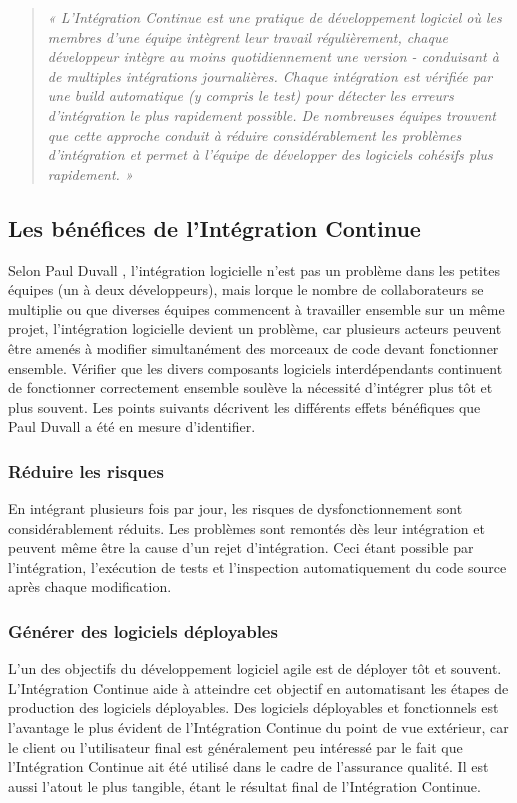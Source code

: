   \begin{quotation}
    \emph{« L'Intégration Continue est une pratique de développement logiciel où les membres d'une équipe intègrent leur travail régulièrement, chaque développeur intègre au moins quotidiennement une version - conduisant à de multiples intégrations journalières. Chaque intégration est vérifiée par une build automatique (y compris le test) pour détecter les erreurs d'intégration le plus rapidement possible. De nombreuses équipes trouvent que cette approche conduit à réduire considérablement les problèmes d'intégration et permet à l'équipe de développer des logiciels cohésifs plus rapidement. »}\\
  \end{quotation}

    \subsection{Les bénéfices de l’Intégration Continue}\label{Benefits}
    Selon Paul Duvall \cite{Duv07}, l'intégration logicielle n’est pas un problème dans les petites équipes (un à deux développeurs), mais lorque le nombre de collaborateurs se multiplie ou que diverses équipes commencent à travailler ensemble sur un même projet, l'intégration logicielle devient un problème, car plusieurs acteurs peuvent être amenés à modifier simultanément des morceaux de code devant fonctionner ensemble. Vérifier que les divers composants logiciels interdépendants continuent de fonctionner correctement ensemble soulève la nécessité d'intégrer plus tôt et plus souvent. Les points suivants décrivent les différents effets bénéfiques que Paul Duvall a été en mesure d'identifier.

      \subsubsection{Réduire les risques}
      En intégrant plusieurs fois par jour, les risques de dysfonctionnement sont considérablement réduits. Les problèmes sont remontés dès leur intégration et peuvent même être la cause d’un rejet d’intégration. Ceci étant possible par l’intégration, l’exécution de tests et l’inspection automatiquement du code source après chaque modification.

      \subsubsection{Générer des logiciels déployables}
      L'un des objectifs du développement logiciel agile est de déployer tôt et souvent. L’Intégration Continue aide à atteindre cet objectif en automatisant les étapes de production des logiciels déployables. Des logiciels déployables et fonctionnels est l'avantage le plus évident de l’Intégration Continue du point de vue extérieur, car le client ou l'utilisateur final est généralement peu intéressé par le fait que l’Intégration Continue ait été utilisé dans le cadre de l'assurance qualité. Il est aussi l'atout le plus tangible, étant le résultat final de l’Intégration Continue.

